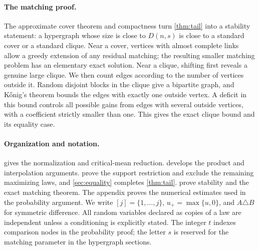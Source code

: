 \paragraph{The matching proof.}
The approximate cover theorem and compactness turn \cref{thm:tail} into a stability statement: a hypergraph whose size is close to $D(n,s)$ is close to a standard cover or a standard clique. Near a cover, vertices with almost complete links allow a greedy extension of any residual matching; the resulting smaller matching problem has an elementary exact solution. Near a clique, shifting first reveals a genuine large clique. We then count edges according to the number of vertices outside it. Random disjoint blocks in the clique give a bipartite graph, and K\H{o}nig's theorem bounds the edges with exactly one outside vertex. A deficit in this bound controls all possible gains from edges with several outside vertices, with a coefficient strictly smaller than one. This gives the exact clique bound and its equality case.

\paragraph{Organization and notation.}
 gives the normalization and critical-mean reduction.  develops the product and interpolation arguments.  prove the support restriction and exclude the remaining maximizing laws, and \cref{sec:equality} completes \cref{thm:tail}.  prove stability and the exact matching theorem. The appendix proves the numerical estimates used in the probability argument. We write $[j]=\{1,\ldots,j\}$, $u_+=\max\{u,0\}$, and $A\triangle B$ for symmetric difference. All random variables declared as copies of a law are independent unless a conditioning is explicitly stated. The integer $t$ indexes comparison nodes in the probability proof; the letter $s$ is reserved for the matching parameter in the hypergraph sections.
